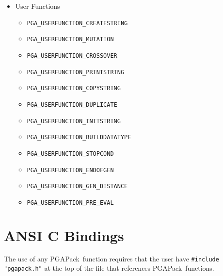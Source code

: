 \documentclass{report}
\newcommand{\pga}{PGAPack}
\begin{document}
\begin{itemize}
\item User Functions
\begin{itemize}
\item \verb+PGA_USERFUNCTION_CREATESTRING+
\item \verb+PGA_USERFUNCTION_MUTATION+
\item \verb+PGA_USERFUNCTION_CROSSOVER+
\item \verb+PGA_USERFUNCTION_PRINTSTRING+
\item \verb+PGA_USERFUNCTION_COPYSTRING+
\item \verb+PGA_USERFUNCTION_DUPLICATE+
\item \verb+PGA_USERFUNCTION_INITSTRING+
\item \verb+PGA_USERFUNCTION_BUILDDATATYPE+
\item \verb+PGA_USERFUNCTION_STOPCOND+
\item \verb+PGA_USERFUNCTION_ENDOFGEN+
\item \verb+PGA_USERFUNCTION_GEN_DISTANCE+
\item \verb+PGA_USERFUNCTION_PRE_EVAL+
\end{itemize}

\end{itemize}

\section*{ANSI C Bindings}\label{app:bindings-c}

The use of any \pga\ function requires that the user have {\tt \#include
"pgapack.h"} at the top of the file that references \pga\ functions.
\vspace{.5in}
\end{document}
